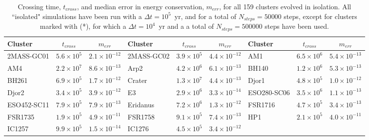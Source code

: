         \begin{table}
        \caption[]{Crossing time, $t_{cross}$, and median error in energy conservation, $m_{err}$, for all 159 clusters evolved in isolation. All ``isolated" simulations have been run with a $\Delta t=10^5$~yr, and for a total of $N_{steps}=50 000$ steps, except for clusters marked with (*), for which a $\Delta t=10^4$~yr and a a total of $N_{steps}=500 000$ steps have been used. }\label{tcross-energy}
        \tiny
        \begin{center}
        \begin{tabular}{l | c | c | l |  c|   c | l | c | c } 
        \hline
                Cluster &       $ t_{cross}$ &  $m_{err}$ & Cluster &       $ t_{cross}$ &  $m_{err}$  & Cluster &       $ t_{cross}$ &  $m_{err}$ \\
                \hline \hline
            2MASS-GC01 & $5.6\times10^5$ &         $ 2.1\times10^{-12}$  &
            2MASS-GC02 &  $3.9\times10^5$ &          $4.4\times10^{-12}$ &
                AM1 &  $6.5\times10^6$ &          $5.4\times10^{-13}$ \\
                AM4 &  $2.2\times10^7$ &          $8.6\times10^{-13}$ & 
                Arp2 &  $4.2\times10^6$ &          $6.1\times10^{-13}$ &  
                BH140 &  $1.2\times10^6$ &         $ 5.3\times10^{-13}$  \\
                BH261 &  $6.9\times10^5$ &          $1.7\times10^{-12}$  &
                Crater &  $1.3\times10^7$ &         $ 4.4\times10^{-13}$ &
                Djor1 &  $4.8\times10^5$ &          $1.0\times10^{-12}$  \\
                Djor2 &  $3.4\times10^5$ &          $3.9\times10^{-12}$ &
                    E3 &  $2.9\times10^6$ &          $3.3\times10^{-14}$  &
        ESO280-SC06 &  $3.5\times10^6$ &         $ 1.1\times10^{-13}$  \\
        ESO452-SC11 &  $7.9\times10^5$ &          $7.9\times10^{-13}$  &
            Eridanus &  $7.2\times10^6$ &          $1.3\times10^{-12}$ &
            FSR1716 &  $4.7\times10^5$ &         $ 3.4\times10^{-13}$  \\
            FSR1735 &  $1.9\times10^5$ &          $4.9\times10^{-11}$ &
            FSR1758 &  $9.1\times10^5$ &          $7.4\times10^{-13}$  &
                HP1 &  $2.1\times10^5$ &          $4.0\times10^{-11}$  \\
                IC1257 &  $9.9\times10^5$ &         $ 1.5\times10^{-14}$ &
                IC1276 &  $4.5\times10^5$ &          $3.4\times10^{-12}$ &

\end{tabular}
\end{center}
\end{table}
